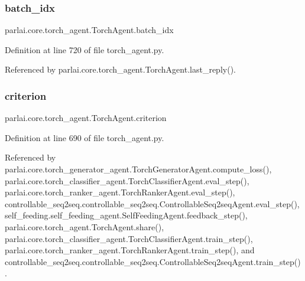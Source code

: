 \subsubsection{\texorpdfstring{batch\+\_\+idx}{batch\_idx}}
{\footnotesize\ttfamily parlai.\+core.\+torch\+\_\+agent.\+Torch\+Agent.\+batch\+\_\+idx}



Definition at line 720 of file torch\+\_\+agent.\+py.



Referenced by parlai.\+core.\+torch\+\_\+agent.\+Torch\+Agent.\+last\+\_\+reply().

\mbox{\label{classparlai_1_1core_1_1torch__agent_1_1TorchAgent_a13d46ae8aed6052679b62c3961a4de62}} 
\subsubsection{\texorpdfstring{criterion}{criterion}}
{\footnotesize\ttfamily parlai.\+core.\+torch\+\_\+agent.\+Torch\+Agent.\+criterion}



Definition at line 690 of file torch\+\_\+agent.\+py.



Referenced by parlai.\+core.\+torch\+\_\+generator\+\_\+agent.\+Torch\+Generator\+Agent.\+compute\+\_\+loss(), parlai.\+core.\+torch\+\_\+classifier\+\_\+agent.\+Torch\+Classifier\+Agent.\+eval\+\_\+step(), parlai.\+core.\+torch\+\_\+ranker\+\_\+agent.\+Torch\+Ranker\+Agent.\+eval\+\_\+step(), controllable\+\_\+seq2seq.\+controllable\+\_\+seq2seq.\+Controllable\+Seq2seq\+Agent.\+eval\+\_\+step(), self\+\_\+feeding.\+self\+\_\+feeding\+\_\+agent.\+Self\+Feeding\+Agent.\+feedback\+\_\+step(), parlai.\+core.\+torch\+\_\+agent.\+Torch\+Agent.\+share(), parlai.\+core.\+torch\+\_\+classifier\+\_\+agent.\+Torch\+Classifier\+Agent.\+train\+\_\+step(), parlai.\+core.\+torch\+\_\+ranker\+\_\+agent.\+Torch\+Ranker\+Agent.\+train\+\_\+step(), and controllable\+\_\+seq2seq.\+controllable\+\_\+seq2seq.\+Controllable\+Seq2seq\+Agent.\+train\+\_\+step().

\mbox{\label{classparlai_1_1core_1_1torch__agent_1_1TorchAgent_abebf29c0bb956bbc5ccc02777d2af3dd}} 
